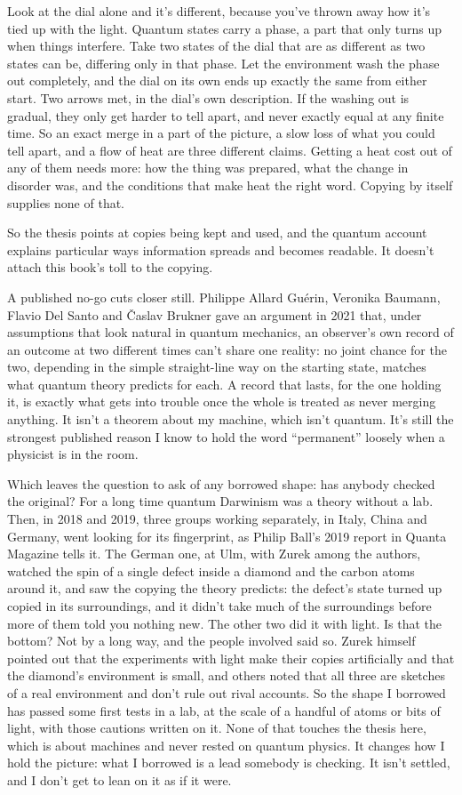 \documentclass[11pt,twoside]{article}
\theoremstyle{thielethm}
\theoremstyle{thieledef}
\theoremstyle{thieledef}
\theoremstyle{thieledef}
\theoremstyle{thielethm}
\theoremstyle{thieleobs}
\theoremstyle{thielethm}
\begin{document}
Look at the dial alone and it's different, because you've thrown away how it's tied up with the light. Quantum states carry a phase, a part that only turns up when things interfere. Take two states of the dial that are as different as two states can be, differing only in that phase. Let the environment wash the phase out completely, and the dial on its own ends up exactly the same from either start. Two arrows met, in the dial's own description. If the washing out is gradual, they only get harder to tell apart, and never exactly equal at any finite time. So an exact merge in a part of the picture, a slow loss of what you could tell apart, and a flow of heat are three different claims. Getting a heat cost out of any of them needs more: how the thing was prepared, what the change in disorder was, and the conditions that make heat the right word. Copying by itself supplies none of that.

So the thesis points at copies being kept and used, and the quantum account explains particular ways information spreads and becomes readable. It doesn't attach this book's toll to the copying.

A published no-go cuts closer still. Philippe Allard Guérin, Veronika Baumann, Flavio Del Santo and Časlav Brukner gave an argument in 2021 that, under assumptions that look natural in quantum mechanics, an observer's own record of an outcome at two different times can't share one reality: no joint chance for the two, depending in the simple straight-line way on the starting state, matches what quantum theory predicts for each. A record that lasts, for the one holding it, is exactly what gets into trouble once the whole is treated as never merging anything. It isn't a theorem about my machine, which isn't quantum. It's still the strongest published reason I know to hold the word ``permanent'' loosely when a physicist is in the room.

Which leaves the question to ask of any borrowed shape: has anybody checked the original? For a long time quantum Darwinism was a theory without a lab. Then, in 2018 and 2019, three groups working separately, in Italy, China and Germany, went looking for its fingerprint, as Philip Ball's 2019 report in Quanta Magazine tells it. The German one, at Ulm, with Zurek among the authors, watched the spin of a single defect inside a diamond and the carbon atoms around it, and saw the copying the theory predicts: the defect's state turned up copied in its surroundings, and it didn't take much of the surroundings before more of them told you nothing new. The other two did it with light. Is that the bottom? Not by a long way, and the people involved said so. Zurek himself pointed out that the experiments with light make their copies artificially and that the diamond's environment is small, and others noted that all three are sketches of a real environment and don't rule out rival accounts. So the shape I borrowed has passed some first tests in a lab, at the scale of a handful of atoms or bits of light, with those cautions written on it. None of that touches the thesis here, which is about machines and never rested on quantum physics. It changes how I hold the picture: what I borrowed is a lead somebody is checking. It isn't settled, and I don't get to lean on it as if it were.
\end{document}
